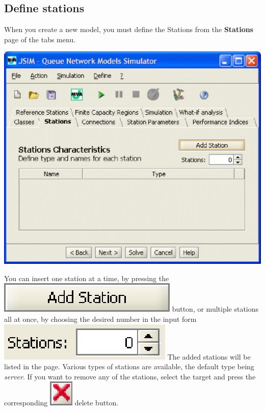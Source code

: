 \subsection{Define stations}
\label{sec:DefineStations}
When you create a new model, you must define the Stations from the \textbf{Stations} page of the tabs menu.\\
\begin{center}
\includegraphics[scale=.5]{img/jsim/define_station1.eps}
\end{center}
You can insert one station at a time, by pressing the \includegraphics[scale=.5]{img/jsim/button_addStation.eps} button, or multiple stations all at once, by choosing the desired number in the input form \includegraphics[scale=.5]{img/jsim/button_Nstations.eps}
The added stations will be listed in the page. Various types of stations are available, the default type being \emph{server}.
If you want to remove any of the stations, select the target and press the corresponding \includegraphics[scale=.5]{img/jsim/delete.eps} delete button.
